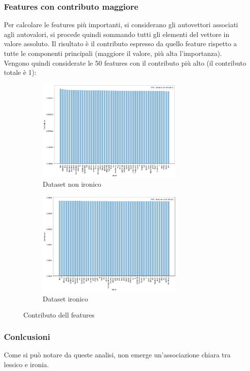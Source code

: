 \documentclass[oneside]{book}
\begin{document}
\subsubsection{Features con contributo maggiore}
Per calcolare le features più importanti, si considerano gli autovettori associati agli autovalori, si procede quindi sommando tutti gli elementi del vettore in valore assoluto. Il risultato è il contributo espresso da quello feature rispetto a tutte le componenti principali (maggiore il valore, più alta l'importanza). Vengono quindi considerate le 50 features con il contributo più alto (il contributo totale è 1):

\begin{figure}[H]
	\begin{subfigure}[H]{0.5 \textwidth}
		\centering
		\includegraphics[width=7.25cm]{assets/pca/non_ironic/contribution.png}
		\caption{Dataset non ironico}
	\end{subfigure}
	\hfill
	\begin{subfigure}[H]{0.5 \textwidth}
		\centering
		\includegraphics[width=7.25cm]{assets/pca/ironic/contribution.png}
		\caption{Dataset ironico}
	\end{subfigure}
	\caption{Contributo dell features}
\end{figure}

\subsubsection{Conlcusioni}
Come si può notare da queste analisi, non emerge un'associazione chiara tra lessico e ironia.
\end{document}

